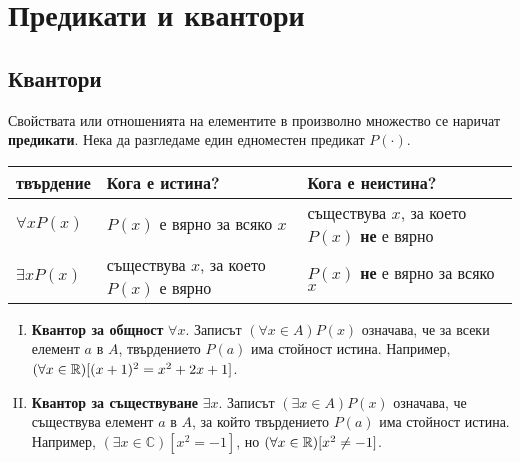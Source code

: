 \section{Предикати и квантори}

\subsection*{Квантори}

Свойствата или отношенията на елементите в произволно множество се наричат {\bf предикати}.
Нека да разгледаме един едноместен предикат $P(\cdot)$.

\bigskip
\begin{tabular}{|l|p{4.2cm}|p{4.5cm}|}
  \hline
  твърдение & Кога е истина? & Кога е неистина?\\
  \hline
  $\forall x P(x)$ & $P(x)$ е вярно за всяко $x$ & съществува $x$, за което $P(x)$ {\bf не} е вярно \\
  \hline
  $\exists x P(x)$ & съществува $x$, за което $P(x)$ е вярно & $P(x)$ {\bf не} е вярно за всяко $x$\\
  \hline
\end{tabular}  
\bigskip

\begin{enumerate}[(I)]
\item 
  {\bf Квантор за общност} $\forall x$.
  Записът $(\forall x \in A) P(x)$ означава, че за всеки елемент $a$ в $A$, 
  твърдението $P(a)$ има стойност истина.
  Например, $(\forall x\in\mathbb{R})[(x+1)^2 = x^2+2x+1]$.
\item
  {\bf Квантор за съществуване} $\exists x$.
  Записът $(\exists x \in A) P(x)$ означава, че съществува елемент $a$ в $A$, 
  за който твърдението $P(a)$ има стойност истина.
  Например, $(\exists x \in\mathbb{C})[x^2 = -1]$, но $(\forall x\in\mathbb{R})[x^2 \neq -1]$.
\end{enumerate}

